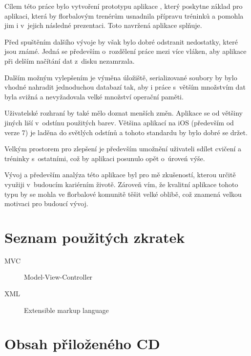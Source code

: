 \documentclass[thesis=B,czech]{FITthesis}[2012/06/26]
\begin{document}
\begin{conclusion}
	Cílem této práce bylo vytvoření prototypu aplikace , který poskytne základ pro aplikaci, která by florbalovým trenérům usnadnila přípravu tréninků a pomohla jim i v~jejich následné prezentaci. Toto navržená aplikace splňuje.

	Před spuštěním dalšího vývoje by však bylo dobré odstranit nedostatky, které jsou známé. Jedná se především o~rozdělení práce mezi více vláken, aby aplikace při delším načítání dat z~disku nezamrzala.

	Dalším možným vylepšením je výměna úložiště, serializované soubory by bylo vhodné nahradit jednoduchou databazí tak, aby i práce s~větším množstvím dat byla svižná a nevyžadovala velké množství operační paměti.

	Uživatelské rozhraní by také mělo doznat menších změn. Aplikace se od většiny jiných liší v~odstínu použitých barev. Většina aplikací na iOS (především od verze 7) je laděna do světlých odstínů a tohoto standardu by bylo dobré se držet.

	Velkým prostorem pro zlepšení je především umožnění uživateli sdílet cvičení a tréninky s~ostatními, což by aplikaci posunulo opět o~úroveń výše.

	Vývoj a především analýza této aplikace byl pro mě zkušeností, kterou určitě využiji v~budoucím kariérním životě. Zároveň vím, že kvalitní aplikace tohoto typu by se mohla ve florbalové komunitě těšit velké oblibě, což znamená velkou motivaci pro budoucí vývoj.
\end{conclusion}




\appendix

\chapter{Seznam použitých zkratek}
\begin{description}
	\item[MVC] Model-View-Controller
	\item[XML] Extensible markup language
\end{description}

\chapter{Obsah přiloženého CD}


\end{document}
